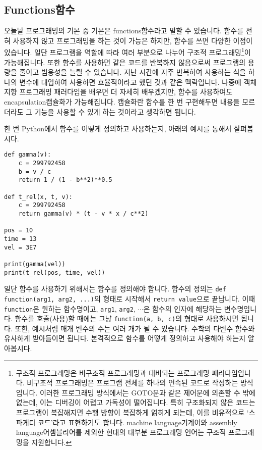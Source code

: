 \documentclass[../main.tex]{subfiles}
\begin{document}
\subsection{Functions함수}
오늘날 프로그래밍의 기본 중 기본은 functions함수라고 말할 수 있습니다.  함수를
전혀 사용하지 않고 프로그래밍을 하는 것이 가능은 하지만, 함수를 쓰면 다양한
이점이 있습니다.  일단 프로그램을 역할에 따라 여러 부분으로 나누어 구조적
프로그래밍\footnote{구조적 프로그래밍은 비구조적 프로그래밍과 대비되는
프로그래밍 패러다임입니다. 비구조적 프로그래밍은 프로그램 전체를 하나의 연속된
코드로 작성하는 방식입니다. 이러한 프로그래밍 방식에서는 GOTO문과 같은 제어문에
의존할 수 밖에 없는데, 이는 디버깅이 어렵고 가독성이 떨어집니다. 특히
구조화되지 않은 코드는 프로그램이 복잡해지면 수행 방향이 복잡하게 얽히게
되는데, 이를 비유적으로 `스파게티 코드'라고 표현하기도 합니다. machine
language기계어와 assembly language어셈블리어를 제외한 현대의 대부분 프로그래밍
언어는 구조적 프로그래밍을 지원합니다.}이 가능해집니다.  또한 함수를 사용하면
같은 코드를 반복하지 않음으로써 프로그램의 용량을 줄이고 범용성을 늘릴 수
있습니다.  지난 시간에 자주 반복하여 사용하는 식을 하나의 변수에 대입하여
사용하면 효율적이라고 했던 것과 같은 맥락입니다.  나중에 객체 지향 프로그래밍
패러다임을 배우면 더 자세히 배우겠지만, 함수를 사용하여도 encapsulation캡슐화가
가능해집니다.  캡슐화란 함수를 한 번 구현해두면 내용을 모르더라도 그 기능을
사용할 수 있게 하는 것이라고 생각하면 됩니다.

한 번 Python에서 함수를 어떻게 정의하고 사용하는지, 아래의 예시를 통해서 살펴봅시다.
\begin{verbatim}
def gamma(v):
    c = 299792458
    b = v / c
    return 1 / (1 - b**2)**0.5

def t_rel(x, t, v):
    c = 299792458
    return gamma(v) * (t - v * x / c**2)

pos = 10
time = 13
vel = 3E7

print(gamma(vel))
print(t_rel(pos, time, vel))
\end{verbatim}
일단 함수를 사용하기 위해서는 함수를 정의해야 합니다.
함수의 정의는 \texttt{def function(arg1, arg2, ...)}의 형태로 시작해서
\texttt{return value}으로 끝납니다. 이때 \verb|function|은 원하는 함수명이고,
\verb|arg1|, \verb|arg2|, $\cdots$은 함수의 인자에 해당하는 변수명입니다.
함수를 호출(사용)할 때에는 그냥 \texttt{function(a, b, c)}의 형태로 사용하시면
됩니다.
또한, 예시처럼 매개 변수의 수는 여러 개가 될 수 있습니다.
수학의 다변수 함수와 유사하게 받아들이면 됩니다.
본격적으로 함수를 어떻게 정의하고 사용해야 하는지 알아봅시다.
\end{document}
